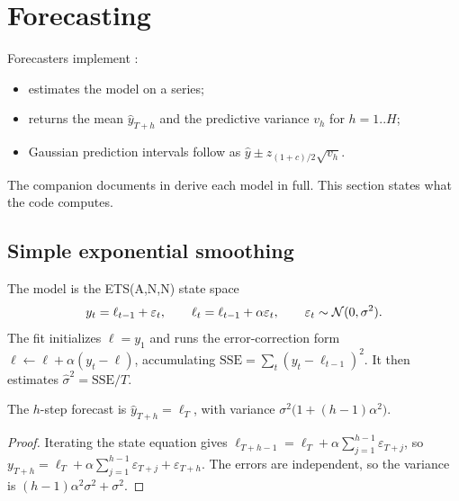 \documentclass[11pt,a4paper]{article}
\makeatletter
\newcommand{\snippetsource}[1]{\csname snippet@#1\endcsname}
\newcommand{\snippet}[3]{%
  }
\makeatother
\begin{document}
\section{Forecasting}\label{sec:forecast}

Forecasters implement :
\begin{itemize}
  \item {} estimates the model on a series;
  \item {} returns the mean $\hat y_{T+h}$ and the predictive variance $v_h$
        for $h=1..H$;
  \item Gaussian prediction intervals follow as $\hat y\pm z_{(1+c)/2}\sqrt{v_h}$.
\end{itemize}
The companion documents in  derive each model in full. This section states
what the code computes.

\subsection{Simple exponential smoothing}
The model is the ETS(A,N,N) state space
\[
  y_t=\ell_{t-1}+\varepsilon_t,\qquad \ell_t=\ell_{t-1}+\alpha\varepsilon_t,\qquad
  \varepsilon_t\sim\mathcal{N}(0,\sigma^2).
\]
The fit initializes $\ell=y_1$ and runs the error-correction form
$\ell\leftarrow\ell+\alpha(y_t-\ell)$, accumulating $\mathrm{SSE}=\sum_t(y_t-\ell_{t-1})^2$.
It then estimates $\hat\sigma^2=\mathrm{SSE}/T$.

\begin{proposition}
The $h$-step forecast is $\hat y_{T+h}=\ell_T$, with variance $\sigma^2\big(1+(h-1)\alpha^2\big)$.
\end{proposition}
\begin{proof}
Iterating the state equation gives $\ell_{T+h-1}=\ell_T+\alpha\sum_{j=1}^{h-1}\varepsilon_{T+j}$,
so $y_{T+h}=\ell_T+\alpha\sum_{j=1}^{h-1}\varepsilon_{T+j}+\varepsilon_{T+h}$. The errors are
independent, so the variance is $(h-1)\alpha^2\sigma^2+\sigma^2$.
\end{proof}
\snippet{ses_fit}{C++}{SES fit and forecast variance}
\end{document}
